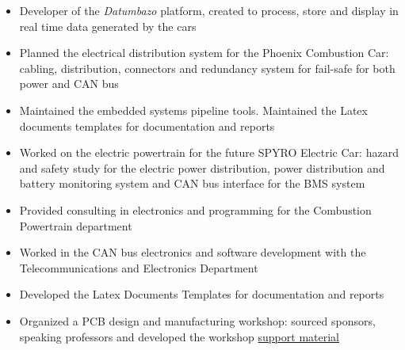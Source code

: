\documentclass[10pt,a4paper,ragged2e,withhyper]{altacv}
\begin{document}
\begin{paracol}{2}

\begin{itemize}
  \item Developer of the \textit{Datumbazo} platform, created to process, store and display in real time data generated by the cars
  \item Planned the electrical distribution system for the Phoenix Combustion Car: cabling, distribution, connectors and redundancy system for fail-safe for both power and CAN bus 
  \item Maintained the embedded systems pipeline tools. Maintained the Latex documents templates for documentation and reports
\end{itemize}

\divider

\begin{itemize}
  \item Worked on the electric powertrain for the future SPYRO Electric Car: hazard and safety study for the electric power distribution, power distribution and battery monitoring system and CAN bus interface for the BMS system 
  \item Provided consulting in electronics and programming for the Combustion Powertrain department
  \item Worked in the CAN bus electronics and software development with the Telecommunications and Electronics Department
  \item Developed the Latex Documents Templates for documentation and reports
\end{itemize}

\divider

\begin{itemize}
  \item Organized a PCB design and manufacturing workshop: sourced sponsors, speaking professors and developed the workshop \href{https://github.com/dvcorreia/ac2-detpic-pcb-shield}{support material}
\end{itemize}


\end{paracol}
\end{document}
